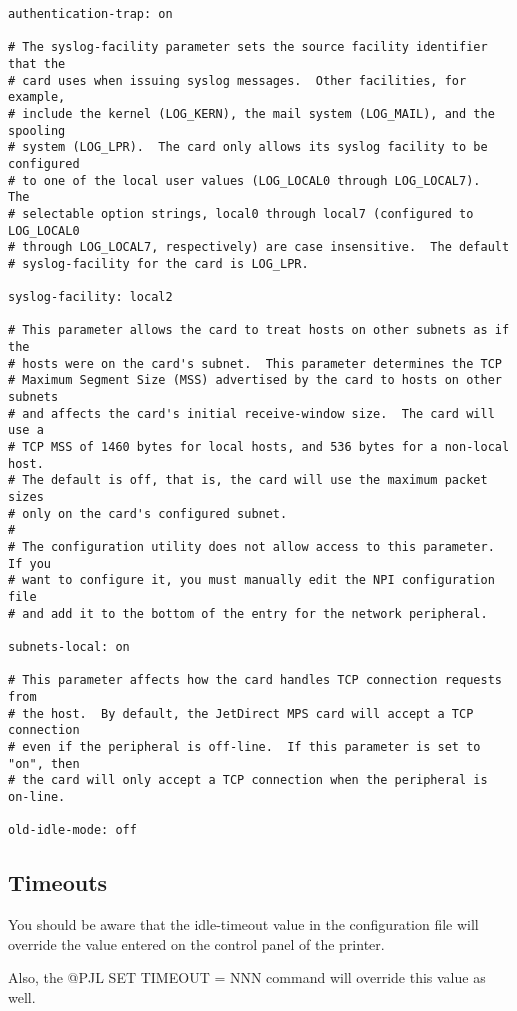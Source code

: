 \documentclass[a4paper]{article}
\begin{document}
\begin{tscreen}
\begin{verbatim}
authentication-trap: on

# The syslog-facility parameter sets the source facility identifier that the
# card uses when issuing syslog messages.  Other facilities, for example,
# include the kernel (LOG_KERN), the mail system (LOG_MAIL), and the spooling
# system (LOG_LPR).  The card only allows its syslog facility to be configured
# to one of the local user values (LOG_LOCAL0 through LOG_LOCAL7).  The
# selectable option strings, local0 through local7 (configured to LOG_LOCAL0
# through LOG_LOCAL7, respectively) are case insensitive.  The default
# syslog-facility for the card is LOG_LPR.

syslog-facility: local2

# This parameter allows the card to treat hosts on other subnets as if the
# hosts were on the card's subnet.  This parameter determines the TCP
# Maximum Segment Size (MSS) advertised by the card to hosts on other subnets
# and affects the card's initial receive-window size.  The card will use a
# TCP MSS of 1460 bytes for local hosts, and 536 bytes for a non-local host.
# The default is off, that is, the card will use the maximum packet sizes
# only on the card's configured subnet.
#
# The configuration utility does not allow access to this parameter.  If you
# want to configure it, you must manually edit the NPI configuration file
# and add it to the bottom of the entry for the network peripheral.

subnets-local: on

# This parameter affects how the card handles TCP connection requests from
# the host.  By default, the JetDirect MPS card will accept a TCP connection
# even if the peripheral is off-line.  If this parameter is set to "on", then
# the card will only accept a TCP connection when the peripheral is on-line.

old-idle-mode: off
\end{verbatim}
\end{tscreen}



\subsection{Timeouts}

You should be aware that the
{\ttfamily idle-timeout}
value in the configuration file will override the value
entered on the control panel of the printer.

Also,
the
{\ttfamily @PJL SET TIMEOUT = NNN}
command will override this value as well.
\end{document}
